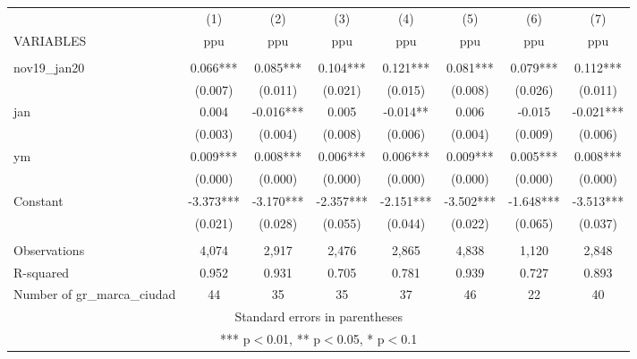 \begin{tabular}{lccccccc} \hline
 & (1) & (2) & (3) & (4) & (5) & (6) & (7) \\
VARIABLES & ppu & ppu & ppu & ppu & ppu & ppu & ppu \\ \hline
 &  &  &  &  &  &  &  \\
nov19\_jan20 & 0.066*** & 0.085*** & 0.104*** & 0.121*** & 0.081*** & 0.079*** & 0.112*** \\
 & (0.007) & (0.011) & (0.021) & (0.015) & (0.008) & (0.026) & (0.011) \\
jan & 0.004 & -0.016*** & 0.005 & -0.014** & 0.006 & -0.015 & -0.021*** \\
 & (0.003) & (0.004) & (0.008) & (0.006) & (0.004) & (0.009) & (0.006) \\
ym & 0.009*** & 0.008*** & 0.006*** & 0.006*** & 0.009*** & 0.005*** & 0.008*** \\
 & (0.000) & (0.000) & (0.000) & (0.000) & (0.000) & (0.000) & (0.000) \\
Constant & -3.373*** & -3.170*** & -2.357*** & -2.151*** & -3.502*** & -1.648*** & -3.513*** \\
 & (0.021) & (0.028) & (0.055) & (0.044) & (0.022) & (0.065) & (0.037) \\
 &  &  &  &  &  &  &  \\
Observations & 4,074 & 2,917 & 2,476 & 2,865 & 4,838 & 1,120 & 2,848 \\
R-squared & 0.952 & 0.931 & 0.705 & 0.781 & 0.939 & 0.727 & 0.893 \\
 Number of gr\_marca\_ciudad & 44 & 35 & 35 & 37 & 46 & 22 & 40 \\ \hline
\multicolumn{8}{c}{ Standard errors in parentheses} \\
\multicolumn{8}{c}{ *** p$<$0.01, ** p$<$0.05, * p$<$0.1} \\
\end{tabular}
